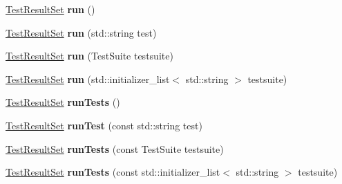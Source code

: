 \begin{DoxyCompactItemize}
\item 
\hypertarget{class_l_test_abf1e99d5dcbacd9ff59fcae0cd16d8e4}{\hyperlink{class_l_test_source_1_1_result_set_3_01_test_result_01_4}{Test\-Result\-Set} {\bfseries run} ()}\label{class_l_test_abf1e99d5dcbacd9ff59fcae0cd16d8e4}

\item 
\hypertarget{class_l_test_a515be6d33421d0c5b03fd9c151a2c404}{\hyperlink{class_l_test_source_1_1_result_set_3_01_test_result_01_4}{Test\-Result\-Set} {\bfseries run} (std\-::string test)}\label{class_l_test_a515be6d33421d0c5b03fd9c151a2c404}

\item 
\hypertarget{class_l_test_a96eb408d7c0baa6e3a852948eae531e2}{\hyperlink{class_l_test_source_1_1_result_set_3_01_test_result_01_4}{Test\-Result\-Set} {\bfseries run} (Test\-Suite testsuite)}\label{class_l_test_a96eb408d7c0baa6e3a852948eae531e2}

\item 
\hypertarget{class_l_test_af15200f37759061311fbd086087dc455}{\hyperlink{class_l_test_source_1_1_result_set_3_01_test_result_01_4}{Test\-Result\-Set} {\bfseries run} (std\-::initializer\-\_\-list$<$ std\-::string $>$ testsuite)}\label{class_l_test_af15200f37759061311fbd086087dc455}

\item 
\hypertarget{class_l_test_a7bf26591cd39583798a7487ff23354da}{\hyperlink{class_l_test_source_1_1_result_set_3_01_test_result_01_4}{Test\-Result\-Set} {\bfseries run\-Tests} ()}\label{class_l_test_a7bf26591cd39583798a7487ff23354da}

\item 
\hypertarget{class_l_test_aaf8171a88b0885a7bb93fb2ebd484df2}{\hyperlink{class_l_test_source_1_1_result_set_3_01_test_result_01_4}{Test\-Result\-Set} {\bfseries run\-Test} (const std\-::string test)}\label{class_l_test_aaf8171a88b0885a7bb93fb2ebd484df2}

\item 
\hypertarget{class_l_test_a3270074e4dd365e3c60fbc9ee13512eb}{\hyperlink{class_l_test_source_1_1_result_set_3_01_test_result_01_4}{Test\-Result\-Set} {\bfseries run\-Tests} (const Test\-Suite testsuite)}\label{class_l_test_a3270074e4dd365e3c60fbc9ee13512eb}

\item 
\hypertarget{class_l_test_ac2aa405b4ff9e21d0ad317c3099c7c1f}{\hyperlink{class_l_test_source_1_1_result_set_3_01_test_result_01_4}{Test\-Result\-Set} {\bfseries run\-Tests} (const std\-::initializer\-\_\-list$<$ std\-::string $>$ testsuite)}\label{class_l_test_ac2aa405b4ff9e21d0ad317c3099c7c1f}


\end{DoxyCompactItemize}
